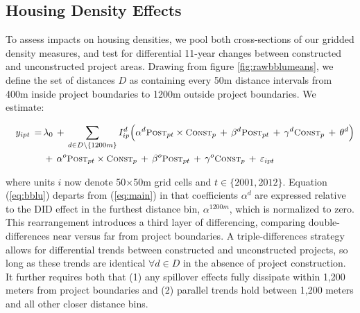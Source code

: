 \documentclass[12pt]{article}
\begin{document}
\subsection{Housing Density Effects}\label{section:bbluestimates}

To assess impacts on housing densities, we pool both cross-sections of our gridded density measures, and test for differential 11-year changes between constructed and unconstructed project areas. Drawing from figure \ref{fig:rawbblumeans}, we define the set of distances $D$ as containing every 50m distance intervals from 400m inside project boundaries to 1200m outside project boundaries. We estimate: 

\vspace{-4mm}

\begin{equation} \label{eq:bblu}
\begin{aligned}
\quad y_{ipt} \, =& \, \lambda_{0} \,+\, \sum\limits_{d\in D\setminus\{1200m\}} I^d_{ip}\Big( \alpha^d \textsc{\small Post}_{pt}\times\textsc{\small Const}_{p} \, + \, \beta^d\textsc{\small Post}_{pt} \, + \, \gamma^d\textsc{\small Const}_{p} \, + \, \theta^{d} \Big) \\
& \, + \, \alpha^o \textsc{\small Post}_{pt}\times\textsc{\small Const}_{p} \, + \, \beta^o\textsc{\small Post}_{pt} \, + \, \gamma^o\textsc{\small Const}_{p} \, + \, \varepsilon_{ipt} \quad 
\end{aligned}
\end{equation}

\noindent where units $i$ now denote 50$\times$50m grid cells and $t\in\{2001,2012\}$. Equation (\ref{eq:bblu}) departs from (\ref{eq:main}) in that coefficients $\alpha^d$ are expressed relative to the DID effect in the furthest distance bin, $\alpha^{1200m}$, which is normalized to zero. This rearrangement introduces  a third layer of differencing, comparing double-differences near versus far from project boundaries. A triple-differences strategy allows for differential trends between constructed and unconstructed projects, so long as these trends are identical $\forall d\in D$ in the absence of project construction. It further requires both that (1) any spillover effects fully dissipate within 1,200 meters from project boundaries and (2) parallel trends hold between 1,200 meters and all other closer distance bins.

\end{document}
